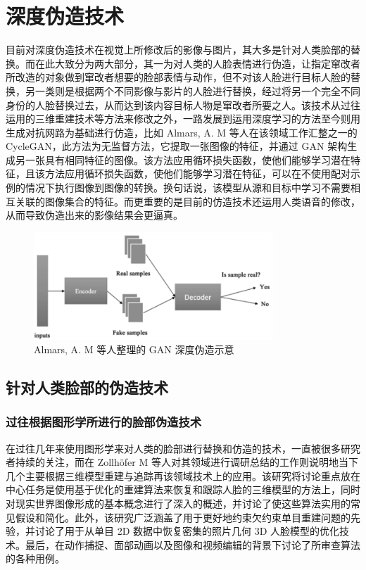 \section{深度伪造技术}

目前对深度伪造技术在视觉上所修改后的影像与图片，其大多是针对人类脸部的替换。而在此大致分为两大部分，其一为对人类的人脸表情进行伪造，让指定窜改者所改造的对象做到窜改者想要的脸部表情与动作，但不对该人脸进行目标人脸的替换，另一类则是根据两个不同影像与影片的人脸进行替换，经过将另一个完全不同身份的人脸替换过去，从而达到该内容目标人物是窜改者所要之人。该技术从过往运用的三维重建技术等方法来修改之外，一路发展到运用深度学习的方法至今则用生成对抗网路为基础进行仿造，比如 Almars, A. M 等人在该领域工作汇整之一的 CycleGAN，此方法为无监督方法，它提取一张图像的特征，并通过 GAN 架构生成另一张具有相同特征的图像。该方法应用循环损失函数，使他们能够学习潜在特征，且该方法应用循环损失函数，使他们能够学习潜在特征，可以在不使用配对示例的情况下执行图像到图像的转换。换句话说，该模型从源和目标中学习不需要相互关联的图像集合的特征。而更重要的是目前的仿造技术还运用人类语音的修改，从而导致伪造出来的影像结果会更逼真。

\begin{figure}[htb]
\centering 
\includegraphics[width=0.80\textwidth]{img/ch1m2.png} 
\caption{Almars, A. M 等人整理的 GAN 深度伪造示意}
\label{Test}
\end{figure}

\subsection{针对人类脸部的伪造技术}

\subsubsection{过往根据图形学所进行的脸部伪造技术}

在过往几年来使用图形学来对人类的脸部进行替换和仿造的技术，一直被很多研究者持续的关注，而在 Zollhöfer M 等人对其领域进行调研总结的工作则说明地当下几个主要根据三维模型重建与追踪再该领域技术上的应用。该研究将讨论重点放在中心任务是使用基于优化的重建算法来恢复和跟踪人脸的三维模型的方法上，同时对现实世界图像形成的基本概念进行了深入的概述，并讨论了使这些算法实用的常见假设和简化。此外，该研究广泛涵盖了用于更好地约束欠约束单目重建问题的先验，并讨论了用于从单目 2D 数据中恢复密集的照片几何 3D 人脸模型的优化技术。最后，在动作捕捉、面部动画以及图像和视频编辑的背景下讨论了所审查算法的各种用例。

